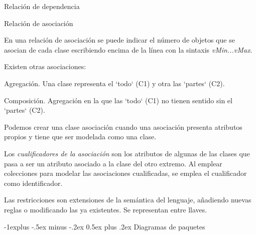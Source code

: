 \documentclass[10pt,a4paper,landscape]{article}
\makeatletter
\renewcommand{\subsection}{\@startsection{subsection}{2}{0mm}%
                                {-1explus -.5ex minus -.2ex}%
                                {0.5ex plus .2ex}%
                                {\normalfont\normalsize\bfseries}}
\makeatother
\begin{document}
\begin{multicols}{3}
\hskip 4pt \parbox{4cm}{
   Relación de dependencia
}

\hskip 4pt \parbox{4cm}{
   Relación de asociación
}

En una relación de asociación se puede indicar el número de objetos que se
asocian de cada clase escribiendo encima de la línea con la sintaxis
\textit{vMin...vMax}.

Existen otras asociaciones:

\hskip 4pt \parbox{4cm}{
   Agregación. Una clase representa el `todo` (C1) y otra las `partes` (C2).
 }

\hskip 4pt \parbox{4cm}{
   Composición. Agregación en la que las `todo` (C1)  no tienen sentido sin el
   `partes` (C2).
 }

 Podemos crear una clase asociación cuando una asociación presenta atributos
 propios y tiene que ser modelada como una clase.

 Los \textit{cualificadores de la asociación} son los atributos de algunas de las clases
 que pasa a ser un atributo asociado a la clase del otro extremo. Al emplear
 colecciones para modelar las asociaciones cualificadas, se emplea el
 cualificador como identificador.

 Las restricciones son extensiones de la semántica del lenguaje, añadiendo
 nuevas reglas o modificando las ya existentes. Se representan entre llaves.

 \subsection{Diagramas de paquetes}


\end{multicols}
\end{document}
